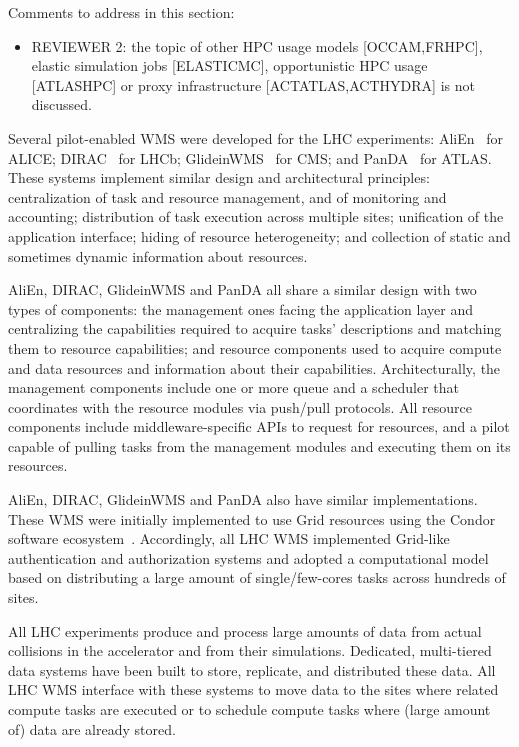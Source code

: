 \ifreview
Comments to address in this section:
\begin{itemize}
	\color{red} 
	\item REVIEWER 2: the topic of other HPC usage models [OCCAM,FRHPC],
	elastic simulation jobs [ELASTICMC], opportunistic HPC usage [ATLASHPC]
	or proxy infrastructure [ACTATLAS,ACTHYDRA] is not discussed.
\end{itemize}
\fi

Several pilot-enabled WMS were developed for the LHC experiments:
AliEn~\cite{Bagnasco2010} for ALICE; DIRAC~\cite{Paterson2010} for LHCb;
GlideinWMS~\cite{sfiligoi2008glideinwms} for CMS; and
PanDA~\cite{maeno2014evolution} for ATLAS. These systems implement similar
design and architectural principles: centralization of task and resource
management, and of monitoring and accounting; distribution of task execution
across multiple sites; unification of the application interface; hiding of
resource heterogeneity; and collection of static and sometimes dynamic
information about resources.

AliEn, DIRAC, GlideinWMS and PanDA all share a similar design with two types
of components: the management ones facing the application layer and
centralizing the capabilities required to acquire tasks' descriptions and
matching them to resource capabilities; and resource components used to
acquire compute and data resources and information about their capabilities.
Architecturally, the management components include one or more queue and a
scheduler that coordinates with the resource modules via push/pull protocols.
All resource components include middleware-specific APIs to request for
resources, and a pilot capable of pulling tasks from the management modules
and executing them on its resources.


AliEn, DIRAC, GlideinWMS and PanDA also have similar implementations. These
WMS were initially implemented to use Grid resources using the Condor
software ecosystem~\cite{thain2005distributed}. Accordingly, all LHC WMS
implemented Grid-like authentication and authorization systems and adopted a
computational model based on distributing a large amount of single/few-cores
tasks across hundreds of sites.

All LHC experiments produce and process large amounts  of data from actual
collisions in the accelerator and from their simulations. Dedicated,
multi-tiered data systems have been built to store, replicate, and
distributed these data. All LHC WMS interface with these systems to move data
to the sites where related compute tasks are executed or to schedule compute
tasks where (large amount of) data are already stored.

